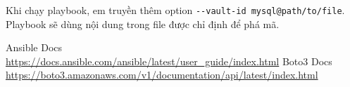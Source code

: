 \documentclass{article}
\begin{document}
\par Khi chạy playbook, em truyền thêm option \verb|--vault-id mysql@path/to/file|. Playbook sẽ dùng nội dung trong file được chỉ định để phá mã.

\begin{thebibliography}{9}
     Ansible Docs \\
    \url{https://docs.ansible.com/ansible/latest/user_guide/index.html}
     Boto3 Docs \\
    \url{https://boto3.amazonaws.com/v1/documentation/api/latest/index.html}
\end{thebibliography}
\end{document}
